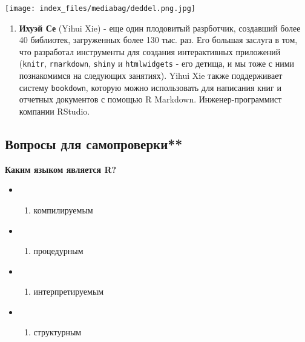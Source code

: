 \documentclass[
  letterpaper,
  DIV=11,
  numbers=noendperiod]{scrreprt}
\providecommand{\tightlist}{%
  \setlength{\itemsep}{0pt}\setlength{\parskip}{0pt}}\usepackage{longtable,booktabs,array}
\begin{document}
\texttt{[image: index\_files/mediabag/deddel.png.jpg]}

\begin{enumerate}
\def\labelenumi{\arabic{enumi}.}
\setcounter{enumi}{2}
\tightlist
\item
  \textbf{Ихуэй Се} (Yihui Xie) - еще один плодовитый разрботчик,
  создавший более 40 библиотек, загруженных более 130 тыс. раз. Его
  большая заслуга в том, что разработал инструменты для создания
  интерактивных приложений (\texttt{knitr}, \texttt{rmarkdown},
  \texttt{shiny} и \texttt{htmlwidgets} - его детища, и мы тоже с ними
  познакомимся на следующих занятиях). Yihui Xie также поддерживает
  систему \texttt{bookdown}, которую можно использовать для написания
  книг и отчетных документов с помощью R Markdown. Инженер-программист
  компании RStudio.
\end{enumerate}

\hypertarget{ux432ux43eux43fux440ux43eux441ux44b-ux434ux43bux44f-ux441ux430ux43cux43eux43fux440ux43eux432ux435ux440ux43aux438}{%
\subsection{Вопросы для
самопроверки**}\label{ux432ux43eux43fux440ux43eux441ux44b-ux434ux43bux44f-ux441ux430ux43cux43eux43fux440ux43eux432ux435ux440ux43aux438}}

\textbf{Каким языком является R?}

\begin{itemize}
\item
  \begin{enumerate}
  \def\labelenumi{(\Alph{enumi})}
  \tightlist
  \item
    компилируемым\\
  \end{enumerate}
\item
  \begin{enumerate}
  \def\labelenumi{(\Alph{enumi})}
  \setcounter{enumi}{1}
  \tightlist
  \item
    процедурным\\
  \end{enumerate}
\item
  \begin{enumerate}
  \def\labelenumi{(\Alph{enumi})}
  \setcounter{enumi}{2}
  \tightlist
  \item
    интерпретируемым\\
  \end{enumerate}
\item
  \begin{enumerate}
  \def\labelenumi{(\Alph{enumi})}
  \setcounter{enumi}{3}
  \tightlist
  \item
    структурным
  \end{enumerate}
\end{itemize}
\end{document}
